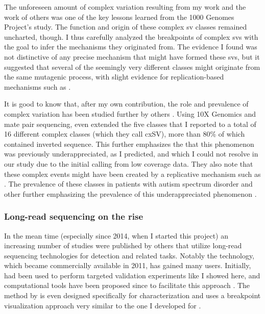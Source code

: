 The unforeseen amount of complex variation resulting from my work and the work
of others was one of the key lessons learned from the 1000 Genomes Project's \sv
study. The function and origin of these complex sv classes remained uncharted,
though. I thus carefully analyzed the breakpoints of complex \acp{sv} with the
goal to infer the mechanisms they originated from. The evidence I found was not
distinctive of any precise mechanism that might have formed these \acp{sv}, but
it suggested that several of the seemingly very different classes might
originate from the same mutagenic process, with slight evidence for replication-based
mechanisms such as \mmbir.

It is good to know that, after my own contribution, the role and prevalence of complex variation has
been studied further by others \citep{Chaisson2014,Collins2017}.
Using 10X Genomics and mate pair sequencing, \citet{Colling2017} even extended
the five classes that I reported to a total of 16 different complex \sv classes
(which they call cxSV), more than 80\% of which contained inverted sequence.
This further emphasizes the that this phenomenon was previously underappreciated,
as I predicted, and which I could not resolve in our study due to the initial
calling from low coverage \mps data. They also note that these complex events might
have been created by a replicative mechanism such as \mmbir.
The prevalence of these classes in patients
with autism spectrum disorder and other
further emphasizing the prevalence
of this underappreciated phenomenon .




\subsubsection{Long-read sequencing on the rise}

In the mean time (especially since 2014, when I started this project) an
increasing number of studies were published by others that utilize long-read
sequencing technologies for \sv detection and related tasks.
Notably the \pacbio technology, which became commercially
available in 2011, has gained many users. Initially, \pacbio had been used to
perform targeted validation experiments like I showed here, and computational tools
have been proposed since to facilitate this approach \citep{Wang2015,Rudewicz2016}.
The method by \citet{Wang2015} is even designed specifically for \sv
characterization and uses a breakpoint visualization approach very similar to
the one I developed for \maze.

